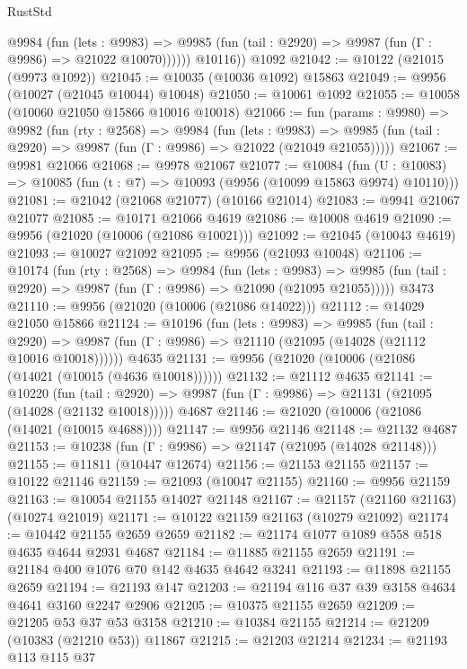\begin{lexlean}{RustStd}
\begin{coremodule}
            @9984
              (fun (lets : @9983) =>
              @9985 (fun (tail : @2920) => @9987 (fun (Γ : @9986) => @21022 @10070))))))
        @10116))
    @1092
@21042 := @10122 (@21015 (@9973 @1092))
@21045 := @10035 (@10036 @1092) @15863
@21049 := @9956 (@10027 (@21045 @10044) @10048)
@21050 := @10061 @1092
@21055 := @10058 (@10060 @21050 @15866 @10016 @10018)
@21066 := fun (params : @9980) =>
  @9982
    (fun (rty : @2568) =>
    @9984
      (fun (lets : @9983) =>
      @9985 (fun (tail : @2920) => @9987 (fun (Γ : @9986) => @21022 (@21049 @21055)))))
@21067 := @9981 @21066
@21068 := @9978 @21067
@21077 := @10084
    (fun (U : @10083) => @10085 (fun (t : @7) => @10093 (@9956 (@10099 @15863 @9974) @10110)))
@21081 := @21042 (@21068 @21077) (@10166 @21014)
@21083 := @9941 @21067 @21077
@21085 := @10171 @21066 @4619
@21086 := @10008 @4619
@21090 := @9956 (@21020 (@10006 (@21086 @10021)))
@21092 := @21045 (@10043 @4619)
@21093 := @10027 @21092
@21095 := @9956 (@21093 @10048)
@21106 := @10174
    (fun (rty : @2568) =>
    @9984
      (fun (lets : @9983) =>
      @9985 (fun (tail : @2920) => @9987 (fun (Γ : @9986) => @21090 (@21095 @21055)))))
    @3473
@21110 := @9956 (@21020 (@10006 (@21086 @14022)))
@21112 := @14029 @21050 @15866
@21124 := @10196
    (fun (lets : @9983) =>
    @9985
      (fun (tail : @2920) =>
      @9987 (fun (Γ : @9986) => @21110 (@21095 (@14028 (@21112 @10016 @10018))))))
    @4635
@21131 := @9956 (@21020 (@10006 (@21086 (@14021 (@10015 (@4636 @10018))))))
@21132 := @21112 @4635
@21141 := @10220
    (fun (tail : @2920) => @9987 (fun (Γ : @9986) => @21131 (@21095 (@14028 (@21132 @10018)))))
    @4687
@21146 := @21020 (@10006 (@21086 (@14021 (@10015 @4688))))
@21147 := @9956 @21146
@21148 := @21132 @4687
@21153 := @10238 (fun (Γ : @9986) => @21147 (@21095 (@14028 @21148)))
@21155 := @11811 (@10447 @12674)
@21156 := @21153 @21155
@21157 := @10122 @21146
@21159 := @21093 (@10047 @21155)
@21160 := @9956 @21159
@21163 := @10054 @21155 @14027 @21148
@21167 := @21157 (@21160 @21163) (@10274 @21019)
@21171 := @10122 @21159 @21163 (@10279 @21092)
@21174 := @10442 @21155 @2659 @2659
@21182 := @21174 @1077 @1089 @558 @518 @4635 @4644 @2931 @4687
@21184 := @11885 @21155 @2659
@21191 := @21184 @400 @1076 @70 @142 @4635 @4642 @3241
@21193 := @11898 @21155 @2659
@21194 := @21193 @147
@21203 := @21194 @116 @37 @39 @3158 @4634 @4641 @3160 @2247 @2906
@21205 := @10375 @21155 @2659
@21209 := @21205 @53 @37 @53 @3158
@21210 := @10384 @21155
@21214 := @21209 (@10383 (@21210 @53)) @11867
@21215 := @21203 @21214
@21234 := @21193
    @113
    @115
    @37

\end{coremodule}
\end{lexlean}

